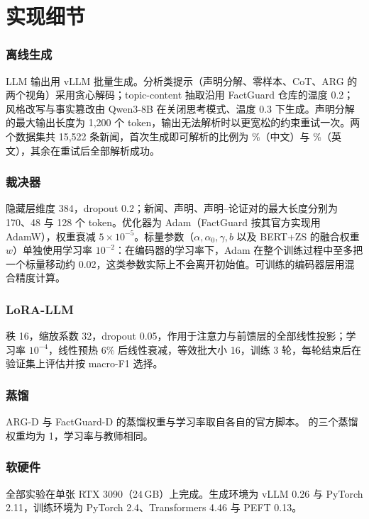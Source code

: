 \section{实现细节}\label{app:impl}

\subsubsection{离线生成}
LLM 输出用 vLLM\citep{kwon2023vllm} 批量生成。分析类提示（声明分解、零样本、CoT、ARG 的两个视角）采用贪心解码；topic-content 抽取沿用 FactGuard 仓库的温度 0.2；风格改写与事实篡改由 Qwen3-8B 在关闭思考模式、温度 0.3 下生成。声明分解的最大输出长度为 1{,}200 个 token，输出无法解析时以更宽松的约束重试一次。两个数据集共 15{,}522 条新闻，首次生成即可解析的比例为 \%（中文）与 \%（英文），其余在重试后全部解析成功。

\subsubsection{裁决器}
隐藏层维度 384，dropout 0.2；新闻、声明、声明--论证对的最大长度分别为 170、48 与 128 个 token。优化器为 Adam（FactGuard 按其官方实现用 AdamW），权重衰减 $5\times10^{-5}$。标量参数（$\alpha,\alpha_0,\gamma,b$ 以及 BERT+ZS 的融合权重 $w$）单独使用学习率 $10^{-2}$：在编码器的学习率下，Adam 在整个训练过程中至多把一个标量移动约 0.02，这类参数实际上不会离开初始值。可训练的编码器层用混合精度计算。

\subsubsection{LoRA-LLM}
秩 16，缩放系数 32，dropout 0.05，作用于注意力与前馈层的全部线性投影；学习率 $10^{-4}$，线性预热 6\% 后线性衰减，等效批大小 16，训练 3 轮，每轮结束后在验证集上评估并按 macro-F1 选择。

\subsubsection{蒸馏}
ARG-D 与 FactGuard-D 的蒸馏权重与学习率取自各自的官方脚本。\student{} 的三个蒸馏权重均为 1，学习率与教师相同。

\subsubsection{软硬件}
全部实验在单张 RTX 3090（24\,GB）上完成。生成环境为 vLLM 0.26 与 PyTorch 2.11，训练环境为 PyTorch 2.4、Transformers 4.46 与 PEFT 0.13。

